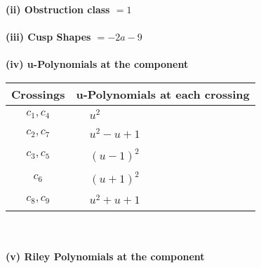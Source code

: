 \documentclass[1p]{elsarticle_modified}
\theoremstyle{definition}
\begin{document}
\flushleft \textbf{(ii) Obstruction class $= 1$}\\~\\
\flushleft \textbf{(iii) Cusp Shapes $= -2 a-9$}\\~\\
\newpage\renewcommand{\arraystretch}{1}
\flushleft \textbf{(iv) u-Polynomials at the component}\newline \\
\begin{tabular}{m{50pt}|m{274pt}}
Crossings & \hspace{64pt}u-Polynomials at each crossing \\
\hline $$\begin{aligned}c_{1},c_{4}\end{aligned}$$&$\begin{aligned}
&u^2
\end{aligned}$\\
\hline $$\begin{aligned}c_{2},c_{7}\end{aligned}$$&$\begin{aligned}
&u^2- u+1
\end{aligned}$\\
\hline $$\begin{aligned}c_{3},c_{5}\end{aligned}$$&$\begin{aligned}
&(u-1)^2
\end{aligned}$\\
\hline $$\begin{aligned}c_{6}\end{aligned}$$&$\begin{aligned}
&(u+1)^2
\end{aligned}$\\
\hline $$\begin{aligned}c_{8},c_{9}\end{aligned}$$&$\begin{aligned}
&u^2+u+1
\end{aligned}$\\
\hline
\end{tabular}\\~\\
\newpage\renewcommand{\arraystretch}{1}
\flushleft \textbf{(v) Riley Polynomials at the component}\newline \\
\end{document}
